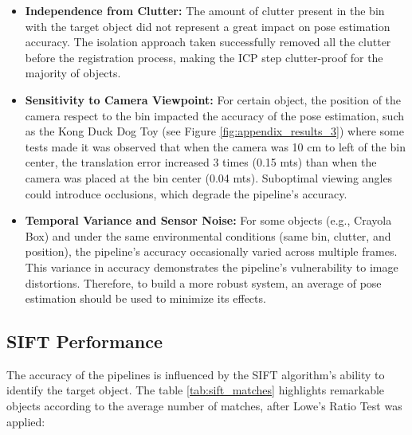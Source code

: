 \begin{itemize}
    \item \textbf{Independence from Clutter:} The amount of clutter present in the bin with the target object did not represent a great impact on pose estimation accuracy. The isolation approach taken successfully removed all the clutter before the registration process, making the ICP step clutter-proof for the majority of objects. 
    
    \item \textbf{Sensitivity to Camera Viewpoint:} For certain object, the position of the camera respect to the bin impacted the accuracy of the pose estimation, such as the Kong Duck Dog Toy (see Figure \ref{fig:appendix_results_3}) where some tests made it was observed that when the camera was 10 cm to left of the bin center, the translation error increased 3 times (0.15 mts) than when the camera was placed at the bin center (0.04 mts). Suboptimal viewing angles could introduce occlusions, which degrade the pipeline's accuracy. 
    
    \item \textbf{Temporal Variance and Sensor Noise:} For some objects (e.g., Crayola Box) and under the same environmental conditions (same bin, clutter, and position), the pipeline's accuracy occasionally varied across multiple frames. This variance in accuracy demonstrates the pipeline's vulnerability to image distortions. Therefore, to build a more robust system, an average of pose estimation should be used to minimize its effects. 
\end{itemize}

\subsection{SIFT Performance}
The accuracy of the pipelines is influenced by the SIFT algorithm's ability to identify the target object. The table \ref{tab:sift_matches} highlights remarkable objects according to the average number of matches, after Lowe's Ratio Test was applied:

